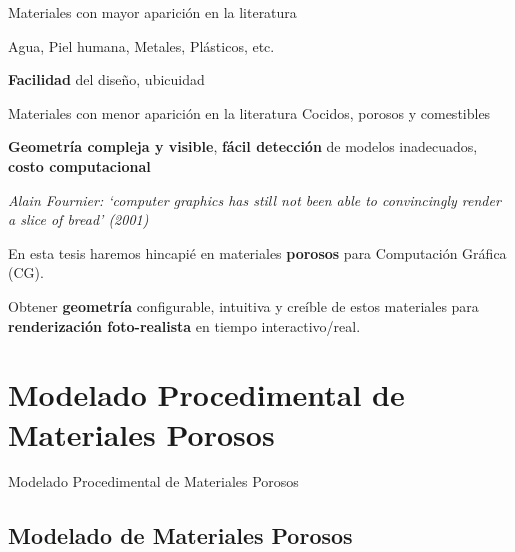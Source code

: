 \documentclass[spanish,unknownkeysallowed,10pt]{beamer}
\begin{document}
\begin{frame}{}

\begin{block}{Materiales con mayor aparición en la literatura}

Agua, Piel humana, Metales, Plásticos, etc. 

\textbf{Facilidad} del diseño, ubicuidad

\end{block}

\begin{block}{Materiales con menor aparición en la literatura}
Cocidos, porosos y comestibles

\textbf{Geometría compleja y visible}, \textbf{fácil detección} de modelos inadecuados, \textbf{costo computacional}


{\it Alain Fournier: `computer graphics has still not been
able to convincingly render a slice of bread' (2001)}
\end{block}


\begin{block}{}
En esta tesis haremos hincapié en materiales \textbf{porosos} para Computación Gráfica (CG).

Obtener \textbf{geometría} configurable, intuitiva y creíble de estos materiales para \textbf{renderización foto-realista} en tiempo interactivo/real.

\end{block}

\end{frame}


\section[Mod. de Materiales Porosos]{Modelado Procedimental de Materiales Porosos}

\begin{frame}
\begin{block}{}
\begin{center}
\vspace{1cm}
\huge{Modelado Procedimental de Materiales Porosos}
\vspace{1cm}
\end{center}
\end{block}
\end{frame}

\subsection{Modelado de Materiales Porosos}
\end{document}
